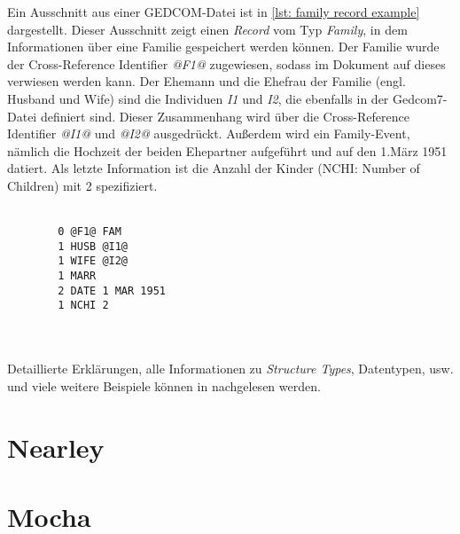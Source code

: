 Ein Ausschnitt aus einer GEDCOM-Datei ist in \ref{lst: family record example} dargestellt. Dieser Ausschnitt zeigt einen \textit{Record} vom Typ \textit{Family}, in dem Informationen über eine Familie gespeichert werden können. Der Familie wurde der Cross-Reference Identifier \textit{@F1@} zugewiesen, sodass im Dokument auf dieses verwiesen werden kann. Der Ehemann und die Ehefrau der Familie (engl. Husband und Wife) sind die Individuen \textit{I1} und \textit{I2}, die ebenfalls in der Gedcom7-Datei definiert sind. Dieser Zusammenhang wird über die Cross-Reference Identifier \textit{@I1@} und \textit{@I2@} ausgedrückt. Außerdem wird ein Family-Event, nämlich die Hochzeit der beiden Ehepartner aufgeführt und auf den 1.März 1951 datiert. Als letzte Information ist die Anzahl der Kinder (NCHI: Number of Children) mit 2 spezifiziert.
\\ \\
\begin{minipage}{1.0\textwidth} \small
	\begin{lstlisting}
		0 @F1@ FAM
		1 HUSB @I1@
		1 WIFE @I2@
		1 MARR
		2 DATE 1 MAR 1951
		1 NCHI 2
	\end{lstlisting}
	\label{lst: family record example}
\end{minipage}
\\ \\
Detaillierte Erklärungen, alle Informationen zu \textit{Structure Types}, Datentypen, usw. und viele weitere Beispiele können in \cite{GEDCOM} nachgelesen werden.


\section{Nearley}
\label{sec: Nearley}

\section{Mocha}
\label{sec: Mocha}